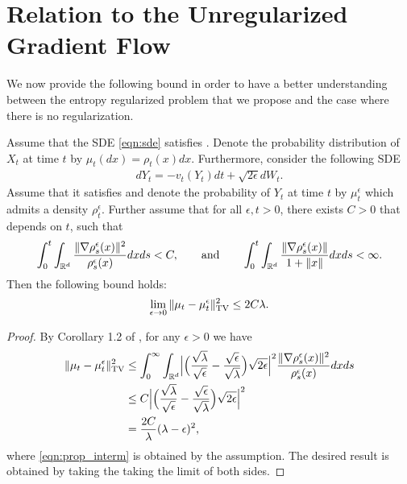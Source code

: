 \section{Relation to the Unregularized Gradient Flow}

We now provide the following bound in order to have a better understanding between the entropy regularized problem that we propose and the case where there is no regularization.

\begin{prop}
\label{prop:dist_statmeas}
Assume that the SDE \eqref{eqn:sde} satisfies . Denote the probability distribution of $X_t$ at time $t$ by $\mu_t(dx) = \rho_t (x) dx$. Furthermore, consider the following SDE
\begin{align}
d Y_t = - v_t(Y_t) dt + \sqrt{2 \epsilon } d W_t. \label{eqn:sde_eps}
\end{align}
Assume that it satisfies  and denote the probability of $Y_t$ at time $t$ by $\mu^\epsilon_t$ which admits a density $\rho^\epsilon_t$. Further assume that for all $\epsilon,t>0$, there exists $C >0$ that depends on $t$, such that
\begin{align}
\int_{0}^t \int_{\mathbb{R}^d} \frac{\|\nabla \rho^\epsilon_s(x) \|^2}{\rho^\epsilon_s(x)} dx ds <C, \qquad \text{and} \qquad \int_{0}^t \int_{\mathbb{R}^d}  \frac{\|\nabla \rho^\epsilon_s(x)\|}{1+\|x\|} dx ds <\infty.
\end{align}
Then the following bound holds:
\begin{align}
\lim_{\epsilon \rightarrow 0} \| \mu_t - \mu^\epsilon_t \|_{\textnormal{TV}}^2 \leq 2 C \lambda.
\end{align}
\end{prop}
%
\begin{proof}
By Corollary 1.2 of \cite{bogachev2016distances}, for any $\epsilon > 0$ we have 
\begin{align}
\| \mu_t - \mu_t^\epsilon \|_{\textnormal{TV}}^2 &\leq \int_0^\infty \int_{\mathbb{R}^d} \Bigl| \Bigl(\frac{\sqrt{\lambda}}{\sqrt{\epsilon}}- \frac{\sqrt{\epsilon}}{\sqrt{\lambda}} \Bigr) \sqrt{2\epsilon}  \Bigr|^2 \frac{\|\nabla \rho^\epsilon_s(x)\|^2}{\rho^\epsilon_s(x)}  dx ds \\
&\leq  C \Bigl| \Bigl(\frac{\sqrt{\lambda}}{\sqrt{\epsilon}}- \frac{\sqrt{\epsilon}}{\sqrt{\lambda}} \Bigr) \sqrt{2\epsilon}  \Bigr|^2 \label{eqn:prop_interm} \\
&= \frac{2C}{\lambda} (\lambda - \epsilon)^2,
\end{align}
where \eqref{eqn:prop_interm} is obtained by the assumption. The desired result is obtained by taking the taking the limit of both sides. 
\end{proof}
%

